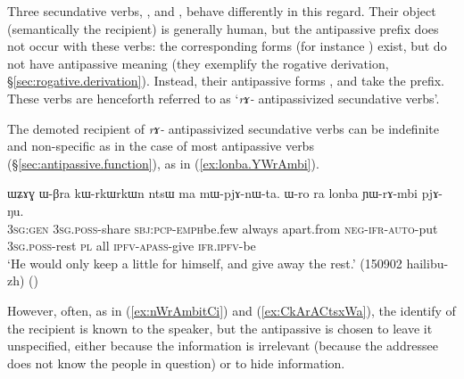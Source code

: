 Three secundative verbs, ,  and  , behave differently in this regard. Their object (semantically the recipient) is generally human, but the  antipassive prefix does not occur with these verbs: the corresponding forms (for instance ) exist, but do not have antipassive meaning  (they exemplify the rogative derivation, §\ref{sec:rogative.derivation}). Instead, their antipassive forms ,  and  take the  prefix. These verbs are henceforth referred to as `\textit{rɤ-} antipassivized secundative verbs'.

The demoted recipient of \textit{rɤ-} antipassivized secundative verbs can be indefinite and non-specific as in the case of most antipassive verbs (§\ref{sec:antipassive.function}), as  in (\ref{ex:lonba.YWrAmbi}).

\begin{exe}
\ex \label{ex:lonba.YWrAmbi}
\gll  ɯʑɤɣ ɯ-βra kɯ-rkɯ\redp{}rkɯn ntsɯ ma mɯ-pjɤ-nɯ-ta. ɯ-ro ra lonba ɲɯ-rɤ-mbi pjɤ-ŋu. \\
\textsc{3sg}:\textsc{gen} \textsc{3sg}.\textsc{poss}-share \textsc{sbj}:\textsc{pcp}-\textsc{emph}\redp{}be.few always apart.from \textsc{neg}-\textsc{ifr}-\textsc{auto}-put \textsc{3sg}.\textsc{poss}-rest \textsc{pl} all \textsc{ipfv}-\textsc{apass}-give \textsc{ifr}.\textsc{ipfv}-be \\
\glt  `He would only keep a little for himself, and give away the rest.' (150902 hailibu-zh) ()
\end{exe}

However, often, as in (\ref{ex:nWrAmbitCi}) and (\ref{ex:CkArACtsxWa}), the identify of the recipient is known to the speaker, but the antipassive is chosen to leave it unspecified, either because the information is irrelevant (because the addressee does not know the people in question) or to hide information.

